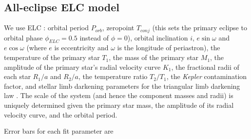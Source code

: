 \subsection{All-eclipse ELC model}
We use ELC : orbital period $P_{orb}$, zeropoint $T_{conj}$ (this sets the primary eclipse to orbital phase $\phi_{ELC} = 0.5$ instead of $\phi = 0$), orbital inclination $i$, $e \sin \omega$ and $e \cos \omega$ (where $e$ is eccentricity and $\omega$ is the longitude of periastron), the temperature of the primary star $T_1$, the mass of the primary star $M_1$, the amplitude of the primary star's radial velocity curve $K_1$, the fractional radii of each star $R_1/a$ and $R_2/a$, the temperature ratio $T_2/T_1$, the \emph{Kepler} contamination factor, and stellar limb darkening parameters for the triangular limb darkening law \citep{kip13}. The scale of the system (and hence the component masses and radii) is uniquely determined given the primary star mass, the amplitude of its radial velocity curve, and the orbital period.

Error bars for each fit parameter are 
